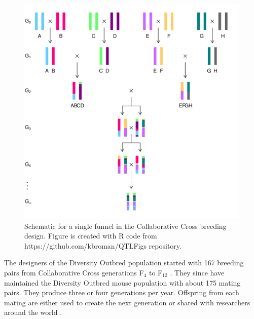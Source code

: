 \documentclass[oneside]{book}\usepackage[]{graphicx}\usepackage[]{color}
\makeatletter
\def\maxwidth{ %
  \ifdim\Gin@nat@width>\linewidth
    \linewidth
  \else
    \Gin@nat@width
  \fi
}
\newenvironment{knitrout}{}{} %
\def\maxwidth{\ifdim\Gin@nat@width>\linewidth\linewidth\else\Gin@nat@width\fi}
\makeatother
\begin{document}
\begin{knitrout}
\color{fgcolor}\begin{figure}
\includegraphics[width=\maxwidth]{figure/ri8-1} \caption[Schematic for a single funnel in the Collaborative Cross breeding design]{Schematic for a single funnel in the Collaborative Cross breeding design. Figure is created with R code from https://github.com/kbroman/QTLFigs repository.}\label{fig:ri8}
\end{figure}


\end{knitrout}




The designers of the Diversity Outbred population started with 167 breeding pairs
from Collaborative Cross generations F$_4$ to F$_{12}$ \citep{svenson2012high}. They since
have maintained the Diversity Outbred mouse population with about 175 mating pairs.
They produce three or four generations per year. Offspring from each mating are either
used to create the next generation or shared with researchers around the 
world \citep{svenson2012high,chesler2016diversity}. 
\end{document}
